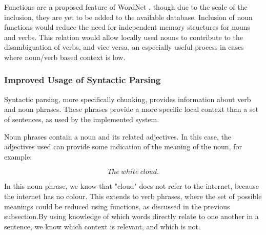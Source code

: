 \documentclass[]{article}
\begin{document}
Functions are a proposed feature of WordNet \cite{WN2Nouns}, though due to the scale of the inclusion, they are yet to be added to the available database. Inclusion of noun functions would reduce the need for independent memory structures for nouns and verbs. This relation would allow locally used nouns to contribute to the disambiguation of verbs, and vice versa, an especially useful process in cases where noun/verb based context is low.

\subsubsection{Improved Usage of Syntactic Parsing}
\label{sec:FutureSyntactic}
Syntactic parsing, more specifically chunking, provides information about verb and noun phrases. These phrases provide a more specific local context than a set of sentences, as used by the implemented system. 

Noun phrases contain a noun and its related adjectives. In this case, the adjectives used can provide some indication of the meaning of the noun, for example:

\[The\: white\: cloud.\]

In this noun phrase, we know that "cloud" does not refer to the internet, because the internet has no colour. This extends to verb phrases, where the set of possible meanings could be reduced using functions, as discussed in the previous subsection.By using knowledge of which words directly relate to one another in a sentence, we know which context is relevant, and which is not.



\newpage


\end{document}
